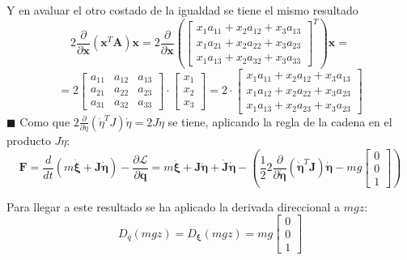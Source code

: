 \documentclass[twoside]{article}
\begin{document}
Y en avaluar el otro costado de la igualdad se tiene el mismo resultado
\begin{equation}
2 \frac{\partial}{\partial \pmb{x}}(\pmb{x}^{T}\pmb{A})\pmb{x}=2 \frac{\partial}{\partial \pmb{x}} \left( \left[ \begin{array}{ccc}
x_1a_{11}+x_2a_{12}+x_3a_{13} \\
x_1a_{21}+x_2a_{22}+x_3a_{23} \\
x_1a_{13}+x_2a_{32}+x_3a_{33}
\end{array} \right]^{T} \right)\pmb{x}=
\end{equation}
\begin{equation}
=2\left[\begin{array}{ccc}
a_{11} & a_{12} & a_{13} \\
a_{21} & a_{22} & a_{23} \\
a_{31} & a_{32} & a_{33} 
\end{array} \right]\cdot\left[\begin{array}{c}
x_1 \\
x_2 \\
x_3
\end{array} \right]=2\cdot\left[ \begin{array}{c}
x_1a_{11}+x_2a_{12}+x_3a_{13} \\
x_1a_{12}+x_2a_{22}+x_3a_{23} \\
x_1a_{13}+x_2a_{23}+x_3a_{23}
\end{array} \right]
\end{equation}
\hfill $\blacksquare$ \newpage
Como que $2 \frac{\partial}{\partial \dot{\eta}}(\dot{\eta}^{T}J)\dot{\eta}=2 J \dot{\eta}$ se tiene, aplicando la regla de la cadena en el producto $J\dot{\eta}$:
\begin{equation}
\pmb{F}=\frac{d}{dt}\left(m \dot{\pmb{\xi}}+\pmb{J} \pmb{\dot{\eta}}\right)-\frac{\partial \mathcal{L}}{\partial \pmb{q}} =m\pmb{\ddot{\xi}} + \pmb{J}\pmb{\ddot{\eta}} + \pmb{\dot{J}}\pmb{\dot{\eta}}-\left( \frac{1}{2} 2 \frac{\partial}{\partial \pmb{\dot{\eta}}} ( \pmb{\dot{\eta}}^{T}\pmb{J})\pmb{\dot{\eta}} - mg\left[\begin{array}{c}
0 \\
0 \\
1
\end{array} \right] \right)
\end{equation}

Para llegar a este resultado se ha aplicado la derivada direccional a $mgz$:
\begin{equation}
D_q(mgz)=D_{\pmb{\xi}}(mgz)=mg \left[ \begin{array}{c}
0 \\
0 \\
1
\end{array} \right]
\end{equation}
\end{document}
